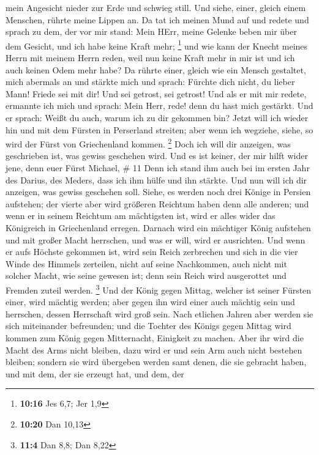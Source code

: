 mein Angesicht nieder zur Erde und schwieg still.  Und
siehe, einer, gleich einem Menschen, rührte meine Lippen an. Da tat ich
meinen Mund auf und redete und sprach zu dem, der vor mir stand: Mein
HErr, meine Gelenke beben mir über dem Gesicht, und ich habe keine Kraft
mehr; \footnote{\textbf{10:16} Jes 6,7; Jer 1,9}  und wie
kann der Knecht meines Herrn mit meinem Herrn reden, weil nun keine
Kraft mehr in mir ist und ich auch keinen Odem mehr habe? 
Da rührte einer, gleich wie ein Mensch gestaltet, mich abermals an und
stärkte mich  und sprach: Fürchte dich nicht, du lieber
Mann! Friede sei mit dir! Und sei getrost, sei getrost! Und als er mit
mir redete, ermannte ich mich und sprach: Mein Herr, rede! denn du hast
mich gestärkt.  Und er sprach: Weißt du auch, warum ich zu
dir gekommen bin? Jetzt will ich wieder hin und mit dem Fürsten in
Perserland streiten; aber wenn ich wegziehe, siehe, so wird der Fürst
von Griechenland kommen. \footnote{\textbf{10:20} Dan 10,13}
 Doch ich will dir anzeigen, was geschrieben ist, was
gewiss geschehen wird. Und es ist keiner, der mir hilft wider jene, denn
euer Fürst Michael, \# 11  Denn ich stand ihm auch bei im
ersten Jahr des Darius, des Meders, dass ich ihm hülfe und ihn stärkte.
 Und nun will ich dir anzeigen, was gewiss geschehen soll.
Siehe, es werden noch drei Könige in Persien aufstehen; der vierte aber
wird größeren Reichtum haben denn alle anderen; und wenn er in seinem
Reichtum am mächtigsten ist, wird er alles wider das Königreich in
Griechenland erregen.  Darnach wird ein mächtiger König
aufstehen und mit großer Macht herrschen, und was er will, wird er
ausrichten.  Und wenn er aufs Höchste gekommen ist, wird
sein Reich zerbrechen und sich in die vier Winde des Himmels zerteilen,
nicht auf seine Nachkommen, auch nicht mit solcher Macht, wie seine
gewesen ist; denn sein Reich wird ausgerottet und Fremden zuteil werden.
\footnote{\textbf{11:4} Dan 8,8; Dan 8,22}  Und der König
gegen Mittag, welcher ist seiner Fürsten einer, wird mächtig werden;
aber gegen ihn wird einer auch mächtig sein und herrschen, dessen
Herrschaft wird groß sein.  Nach etlichen Jahren aber werden
sie sich miteinander befreunden; und die Tochter des Königs gegen Mittag
wird kommen zum König gegen Mitternacht, Einigkeit zu machen. Aber ihr
wird die Macht des Arms nicht bleiben, dazu wird er und sein Arm auch
nicht bestehen bleiben; sondern sie wird übergeben werden samt denen,
die sie gebracht haben, und mit dem, der sie erzeugt hat, und dem, der
